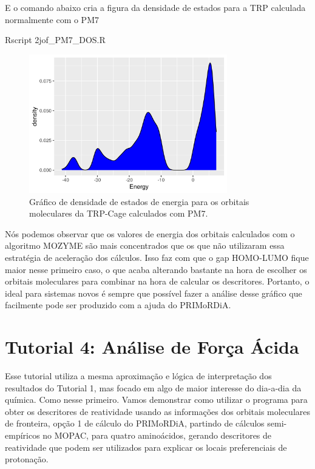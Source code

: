 \documentclass[a4paper,11pt]{refart}
\begin{document}
E o comando abaixo cria a figura da densidade de estados para a TRP calculada normalmente com o PM7

\hspace*{-\leftmarginwidth}
\begin{minipage}{\fullwidth}
	\begin{commandshell}Rscript 2jof_PM7_DOS.R\end{commandshell}
\end{minipage}


\hspace*{-\leftmarginwidth}
\begin{minipage}{\fullwidth}
	\begin{figure}[H]
		\begin{center}
			\includegraphics[width=3.4in]{images/tut3_img32}
			\caption{Gráfico de densidade de estados de energia para os orbitais moleculares da TRP-Cage calculados com PM7.}
			\label{fig_tut3_31}
		\end{center}
	\end{figure}
\end{minipage}

Nós podemos observar que os valores de energia dos orbitais calculados com o algoritmo MOZYME são mais concentrados que os que não utilizaram essa estratégia de aceleração dos cálculos. Isso faz com que o gap HOMO-LUMO fique maior nesse primeiro caso, o que acaba alterando bastante na hora de escolher os orbitais moleculares para combinar na hora de calcular os descritores. Portanto, o ideal para sistemas novos é sempre que possível fazer a análise desse gráfico que facilmente pode ser produzido com a ajuda do PRIMoRDiA.   

\newpage
\section{Tutorial 4: Análise de Força Ácida}

Esse tutorial utiliza a mesma aproximação e lógica de interpretação dos resultados do Tutorial 1, mas focado em algo de maior interesse do dia-a-dia da química. Como nesse primeiro. Vamos demonstrar como utilizar o programa para obter os descritores de reatividade usando as informações dos orbitais moleculares de fronteira, opção 1 de cálculo do PRIMoRDiA, partindo de cálculos semi-empíricos no MOPAC, para quatro aminoácidos,  gerando descritores de reatividade que podem ser utilizados para explicar os locais preferenciais de protonação.
\end{document}
